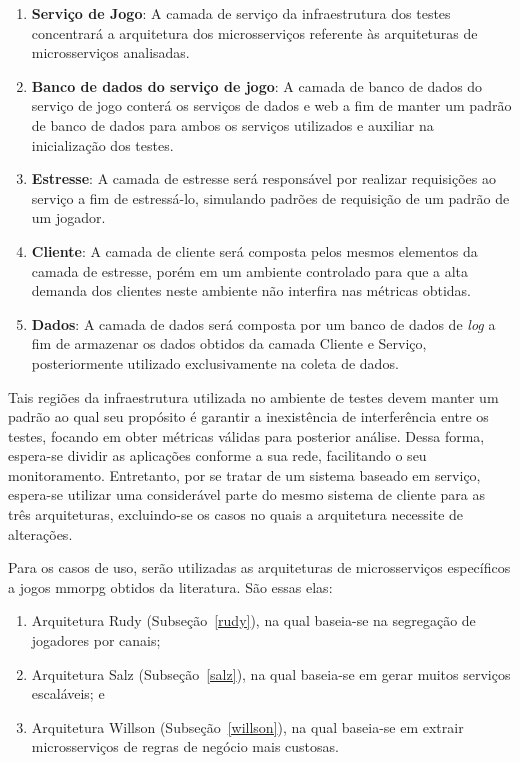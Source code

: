 \begin{enumerate}
  \item \textbf{Serviço de Jogo}: A camada de serviço da infraestrutura dos testes concentrará a arquitetura dos microsserviços referente às arquiteturas de microsserviços analisadas.
  \item \textbf{Banco de dados do serviço de jogo}: A camada de banco de dados do serviço de jogo conterá os serviços de dados e web a fim de manter um padrão de banco de dados para ambos os serviços utilizados e auxiliar na inicialização dos testes.
  \item \textbf{Estresse}: A camada de estresse será responsável por realizar requisições ao serviço a fim de estressá-lo, simulando padrões de requisição de um padrão de um jogador.
  \item \textbf{Cliente}: A camada de cliente será composta pelos mesmos elementos da camada de estresse, porém em um ambiente controlado para que a alta demanda dos clientes neste ambiente não interfira nas métricas obtidas.
  \item \textbf{Dados}: A camada de dados será composta por um banco de dados de \textit{log} a fim de armazenar os dados obtidos da camada Cliente e Serviço, posteriormente utilizado exclusivamente na coleta de dados.
\end{enumerate}



Tais regiões da infraestrutura utilizada no ambiente de testes devem manter um padrão ao qual seu propósito é garantir a inexistência de interferência entre os testes, focando em obter métricas válidas para posterior análise.
%
Dessa forma, espera-se dividir as aplicações conforme a sua rede, facilitando o seu monitoramento.
%
Entretanto, por se tratar de um sistema baseado em serviço, espera-se utilizar uma considerável parte do mesmo sistema de cliente para as três arquiteturas, excluindo-se os casos no quais a arquitetura necessite de alterações.




Para os casos de uso, serão utilizadas as arquiteturas de microsserviços específicos a jogos \ac{mmorpg} obtidos da literatura.
%
São essas elas:



\begin{enumerate}
  \item Arquitetura Rudy (Subseção~\ref{rudy}), na qual baseia-se na segregação de jogadores por canais;
  \item Arquitetura Salz (Subseção~\ref{salz}), na qual baseia-se em gerar muitos serviços escaláveis; e
  \item Arquitetura Willson (Subseção~\ref{willson}), na qual baseia-se em extrair microsserviços de regras de negócio mais custosas.
\end{enumerate}



